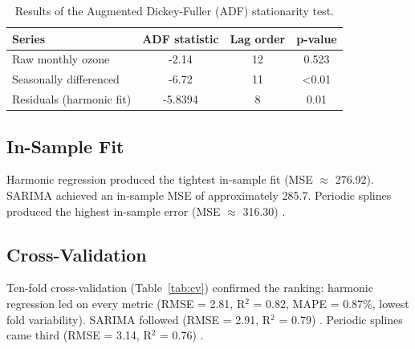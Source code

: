 \documentclass[10pt,twoside]{article}
\numberwithin{equation}{section}
\begin{document}
\begin{table}[htbp]

\centering

\caption{Results of the Augmented Dickey-Fuller (ADF) stationarity test.}

\label{tab:adf}

\begin{tabular}{lccc}

\toprule

\textbf{Series} & \textbf{ADF statistic} & \textbf{Lag order} & \textbf{p-value} \\

\midrule

Raw monthly ozone & -2.14 & 12 & 0.523 \\

Seasonally differenced & -6.72 & 11 & <0.01 \\

Residuals (harmonic fit) & -5.8394 & 8 & 0.01 \\

\bottomrule

\end{tabular}

\end{table}



\subsection{In-Sample Fit}

Harmonic regression produced the tightest in-sample fit (MSE $\approx$ 276.92). SARIMA achieved an in-sample MSE of approximately 285.7. Periodic splines produced the highest in-sample error (MSE $\approx$ 316.30) \cite{Wood2017}.



\subsection{Cross-Validation}

Ten-fold cross-validation (Table~\ref{tab:cv}) confirmed the ranking: harmonic regression led on every metric (RMSE = 2.81, R$^2$ = 0.82, MAPE = 0.87\%, lowest fold variability). SARIMA followed (RMSE = 2.91, R$^2$ = 0.79) \cite{Hyndman2021}. Periodic splines came third (RMSE = 3.14, R$^2$ = 0.76) \cite{Wood2017}.
\end{document}
